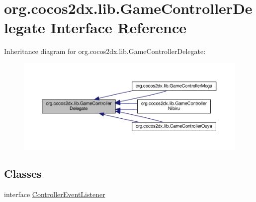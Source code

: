 \hypertarget{interfaceorg_1_1cocos2dx_1_1lib_1_1GameControllerDelegate}{}\section{org.\+cocos2dx.\+lib.\+Game\+Controller\+Delegate Interface Reference}
\label{interfaceorg_1_1cocos2dx_1_1lib_1_1GameControllerDelegate}


Inheritance diagram for org.\+cocos2dx.\+lib.\+Game\+Controller\+Delegate\+:
\nopagebreak
\begin{figure}[H]
\begin{center}
\leavevmode
\includegraphics[width=350pt]{interfaceorg_1_1cocos2dx_1_1lib_1_1GameControllerDelegate__inherit__graph}
\end{center}
\end{figure}
\subsection*{Classes}
\begin{DoxyCompactItemize}
\item 
interface \hyperlink{interfaceorg_1_1cocos2dx_1_1lib_1_1GameControllerDelegate_1_1ControllerEventListener}{Controller\+Event\+Listener}
\end{DoxyCompactItemize}
